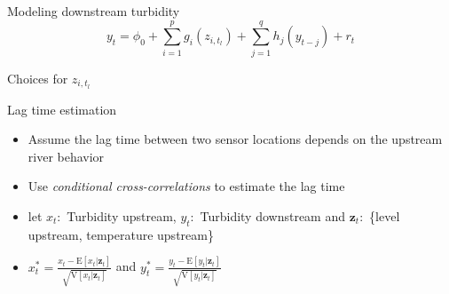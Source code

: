 \documentclass[14pt,ignorenonframetext,compress]{beamer}
\begin{document}
\begin{frame}{Modeling downstream turbidity}
\protect\hypertarget{modeling-downstream-turbidity}{}
\begin{equation*}\label{eq:gam_main}
y_t = \phi_0 + \sum_{i=1}^pg_i(z_{i,t_l}) + \sum_{j=1}^qh_j(y_{t-j}) + r_t
\end{equation*}

\begin{block}{Choices for \(z_{i,t_l}\)}
\protect\hypertarget{choices-for-z_it_l}{}
\begin{table}
\centering\begingroup\fontsize{10}{12}\selectfont

\endgroup{}
\end{table}
\end{block}
\end{frame}

\begin{frame}{Lag time estimation}
\protect\hypertarget{lag-time-estimation}{}
\begin{itemize}
\item
  Assume the lag time between two sensor locations depends on the
  upstream river behavior
\item
  Use \emph{conditional cross-correlations} to estimate the lag time
\item
  let \(x_t:\) Turbidity upstream, \(y_t:\) Turbidity downstream and
  \(\bm{z}_t:\) \{level upstream, temperature upstream\}
\item
  \(x^*_t = \frac{x_t - \text{E}[x_t|\bm{z}_t]}{\sqrt{\text{V}[x_t|\bm{z}_t]}}\)
  and
  \(y^*_t = \frac{y_t - \text{E}[y_t|\bm{z}_t]}{\sqrt{\text{V}[y_t|\bm{z}_t]}}\)
\end{itemize}
\end{frame}
\end{document}
